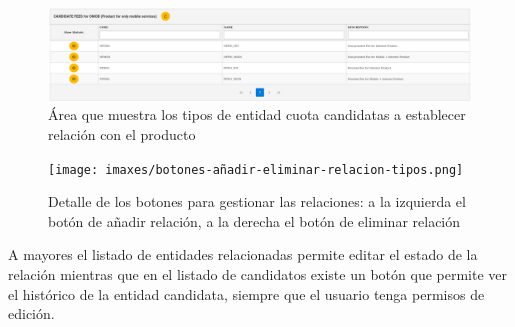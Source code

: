 \begin{figure}[H]
  \centering
  \includegraphics[width=\textwidth]{imaxes/area-tipos-entidades-candidatas.png}
  \caption{Área que muestra los tipos de entidad cuota candidatas a establecer relación con el producto}
  \label{fig:area-tipos-entidades-candidatas}
\end{figure}



\begin{figure}[H]
  \centering
  \texttt{[image: imaxes/botones-añadir-eliminar-relacion-tipos.png]}
  \caption{Detalle de los botones para gestionar las relaciones: a la izquierda el botón de añadir relación, a la derecha el botón de eliminar relación}
  \label{fig:botones-añadir-eliminar-relacion-tipos}
\end{figure}

A mayores el listado de entidades relacionadas permite editar el estado de la relación mientras que en el listado de candidatos existe un botón que permite ver el histórico de la entidad candidata, siempre que el usuario tenga permisos de edición.



